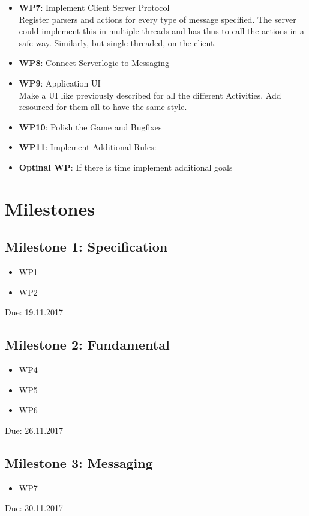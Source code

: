 \documentclass{sig-alternate}
\begin{document}
\begin{itemize}
		\item {\bf WP7}: Implement Client Server Protocol\\
		Register parsers and actions for every type of message specified. The server could implement this in multiple threads and has thus to call the actions in a safe way. Similarly, but single-threaded, on the client.	
		
		\item {\bf WP8}: Connect Serverlogic to Messaging	
		
		\item {\bf WP9}: Application UI\\
		Make a UI like previously described for all the different Activities. Add resourced for them all to have the same style.
		
		\item {\bf WP10}: Polish the Game and Bugfixes
		
		\item {\bf WP11}: Implement Additional Rules:
		
		\item {\bf Optinal WP}: If there is time implement additional goals 
        
        
\end{itemize}

\section{Milestones}

\subsection{Milestone 1: Specification}
\begin{itemize}
	\item WP1
	\item WP2
\end{itemize}
Due: 19.11.2017

\subsection{Milestone 2: Fundamental}
\begin{itemize}
	\item WP4
	\item WP5
	\item WP6
\end{itemize}
Due: 26.11.2017
	
\subsection{Milestone 3: Messaging}
\begin{itemize}
	\item WP7
\end{itemize}
Due: 30.11.2017
\end{document}
